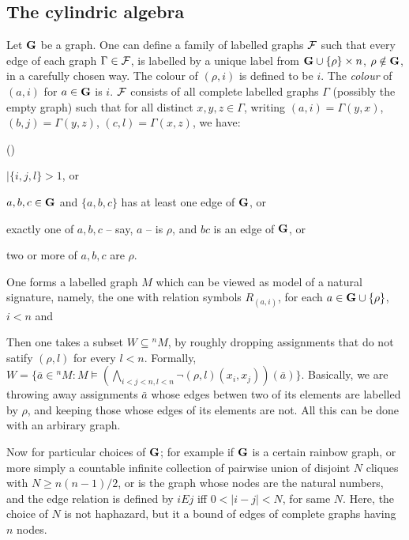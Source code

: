 \documentclass[12pt]{article}
\newcounter{item}[section]
\newcounter{kirshb}
\newenvironment{enumarab}{\setcounter{kirshb}{1}
\begin{list}{(\arabic{kirshb})}{\usecounter{kirshb}} }{\end{list}}
\theoremstyle{definition}
\def\G{{\sf G}}
\def\G{{\bf G}}
\begin{document}
\subsection{The cylindric algebra}

Let $\G$ be a graph. One can  define a family of labelled graphs $\cal F$ such that every edge of each graph $\Gamma\in {\cal F}$,
is labelled  by a unique label from
$\G\cup \{\rho\}\times n$, $\rho\notin \G$, in a carefully chosen way. The colour of $(\rho, i)$ is
defined to be $i$. The \textit{colour} of $(a, i)$ for $a \in \G$  is $i$.
$\cal F$ consists of all complete labelled graphs $\Gamma$ (possibly
the empty graph) such that for all distinct $ x, y, z \in \Gamma$,
writing $ (a, i) = \Gamma (y, x)$, $ (b, j) = \Gamma (y, z)$, $ (c,l) = \Gamma (x, z)$, we have:\\
\begin{enumarab}
\item $| \{ i, j, l \} > 1 $, or
\item $ a, b, c \in \G$ and $ \{ a, b, c \} $ has at least one edge
of $\G$, or
\item exactly one of $a, b, c$ -- say, $a$ -- is $\rho$, and $bc$ is
an edge of $\G$, or
\item two or more of $a, b, c$ are $\rho$.
\end{enumarab}

One forms a labelled graph $M$ which can be viewed as model of a natural signature,
namely, the one with relation symbols $R_{(a, i)}$, for each $a \in \G \cup \{\rho\}$, $i<n$ and

Then one takes a subset $W\subseteq {}^nM$, by roughly dropping assignments that do not satify $(\rho, l)$ for every $l<n$.
Formally, $W = \{ \bar{a} \in {}^n M : M \models ( \bigwedge_{i < j < n,
l < n} \neg (\rho, l)(x_i, x_j))(\bar{a}) \}.$
Basically, we are throwing away assignments $\bar{a}$ whose edges betwen two of its elements are labelled by $\rho$, and keeping those
whose edges of its elements are not.
All this can be done with an arbirary graph.

Now for particular choices of $\G$; for example if $\G$ is a certain rainbow graph, or more simply a countable infinite collection of pairwise
union of disjoint $N$ cliques with $N\geq n(n-1)/2$, or  is the graph whose nodes are the natural numbers, and the edge relation is defined by
$iEj$ iff $0<|i-j|<N$, for same $N.$ Here, the choice of $N$ is not haphazard, but it a bound of edges of complete graphs having $n$ nodes. 
\end{document}
